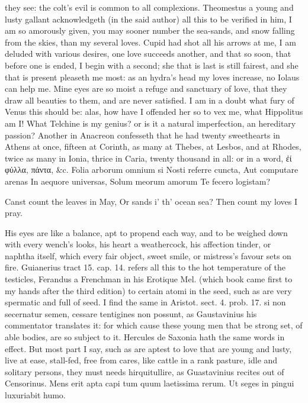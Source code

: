 {they see: the colt's evil is common to all complexions. Theomestus a
young and lusty gallant acknowledgeth (in the said author) all this to
be verified in him, I am so amorously given, you may sooner
number the sea-sands, and snow falling from the skies, than my several
loves. Cupid had shot all his arrows at me, I am deluded with various
desires, one love succeeds another, and that so soon, that before one
is ended, I begin with a second; she that is last is still fairest, and
she that is present pleaseth me most: as an hydra's head my loves
increase, no Iolaus can help me. Mine eyes are so moist a refuge and
sanctuary of love, that they draw all beauties to them, and are never
satisfied. I am in a doubt what fury of Venus this should be: alas, how
have I offended her so to vex me, what Hippolitus am I! What Telchine
is my genius? or is it a natural imperfection, an hereditary passion?
Another in Anacreon confesseth that he had twenty sweethearts in
Athens at once, fifteen at Corinth, as many at Thebes, at Lesbos, and
at Rhodes, twice as many in Ionia, thrice in Caria, twenty thousand in
all: or in a word, ἐί φύλλα, πάντα, \&c.
Folia arborum omnium si
Nosti referre cuncta,
Aut computare arenas
In aequore universas,
Solum meorum amorum
Te fecero logistam?

Canst count the leaves in May,
Or sands i' th' ocean sea?
Then count my loves I pray.

His eyes are like a balance, apt to propend each way, and to be weighed
down with every wench's looks, his heart a weathercock, his affection
tinder, or naphtha itself, which every fair object, sweet smile, or
mistress's favour sets on fire. Guianerius tract 15. cap. 14. refers
all this to the hot temperature of the testicles, Ferandus a
Frenchman in his Erotique Mel. (which book came first to my hands
after the third edition) to certain atomi in the seed, such as are very
spermatic and full of seed. I find the same in Aristot. sect. 4. prob.
17. si non secernatur semen, cessare tentigines non possunt, as
Gaustavinius his commentator translates it: for which cause these young
men that be strong set, of able bodies, are so subject to it. Hercules
de Saxonia hath the same words in effect. But most part I say, such as
are aptest to love that are young and lusty, live at ease, stall-fed,
free from cares, like cattle in a rank pasture, idle and solitary
persons, they must needs hirquitullire, as Guastavinius recites out of
Censorinus.
Mens erit apta capi tum quum laetissima rerum.
Ut seges in pingui luxuriabit humo.

}
